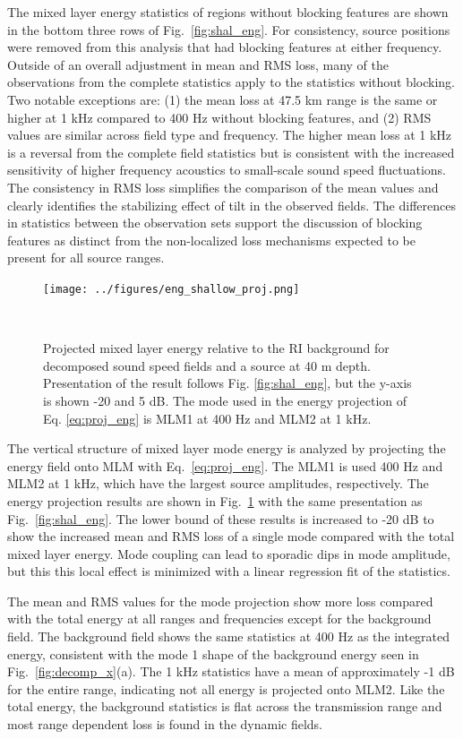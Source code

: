 \documentclass[preprint,NumberedRefs]{JASA}
\begin{document}
The mixed layer energy statistics of regions without blocking features are shown in the bottom three rows of Fig.~\ref{fig:shal_eng}. For consistency, source positions were removed from this analysis that had blocking features at either frequency. Outside of an overall adjustment in mean and RMS loss, many of the observations from the complete statistics apply to the statistics without blocking. Two notable exceptions are: (1) the mean loss at 47.5 km range is the same or higher at 1 kHz compared to 400 Hz without blocking features, and (2) RMS values are similar across field type and frequency. The higher mean loss at 1 kHz is a reversal from the complete field statistics but is consistent with the increased sensitivity of higher frequency acoustics to small-scale sound speed fluctuations. The consistency in RMS loss simplifies the comparison of the mean values and clearly identifies the stabilizing effect of tilt in the observed fields. The differences in statistics between the observation sets support the discussion of blocking features as distinct from the non-localized loss mechanisms expected to be present for all source ranges.

\begin{figure}
\texttt{[image: ../figures/eng\_shallow\_proj.png]}
    \caption{Projected mixed layer energy relative to the RI background for decomposed sound speed fields and a source at 40 m depth. Presentation of the result follows Fig. \ref{fig:shal_eng}, but the y-axis is shown -20 and 5 dB. The mode used in the energy projection of Eq. \eqref{eq:proj_eng} is MLM1 at 400 Hz and MLM2 at 1 kHz.}
    \label{fig:shal_proj}
\end{figure}
The vertical structure of mixed layer mode energy is analyzed by projecting the energy field onto MLM with Eq.~\eqref{eq:proj_eng}. The MLM1 is used 400 Hz and MLM2 at 1 kHz, which have the largest source amplitudes, respectively. The energy projection results are shown in Fig.~\ref{fig:shal_proj} with the same presentation as Fig.~\ref{fig:shal_eng}. The lower bound of these results is increased to -20 dB to show the increased mean and RMS loss of a single mode compared with the total mixed layer energy. Mode coupling can lead to sporadic dips in mode amplitude, but this this local effect is minimized with a linear regression fit of the statistics.

The mean and RMS values for the mode projection show more loss compared with the total energy at all ranges and frequencies except for the background field. The background field shows the same statistics at 400 Hz as the integrated energy, consistent with the mode 1 shape of the background energy seen in Fig.~\ref{fig:decomp_x}(a). The 1 kHz statistics have a mean of approximately -1 dB for the entire range, indicating not all energy is projected onto MLM2. Like the total energy, the background statistics is flat across the transmission range and most range dependent loss is found in the dynamic fields.
\end{document}
